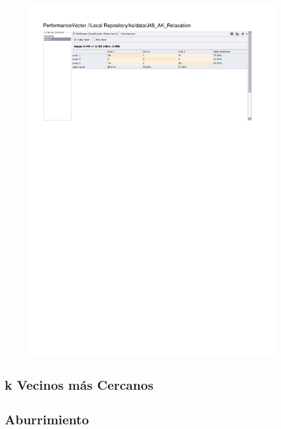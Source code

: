 \begin{figure}[htp]
  \centerline{\includegraphics[trim=0 683 0 60,clip,width=16.09cm]{results/J48_K_Relaxation.pdf}} \caption{
} \label{J48_K_Relaxation}
\end{figure}

\clearpage
\FloatBarrier
\subsection{k Vecinos más Cercanos}
\subsection{Aburrimiento}


